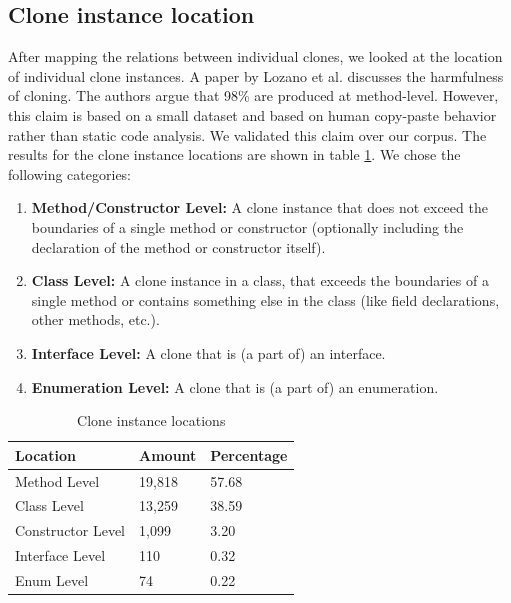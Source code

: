 \documentclass[a4paper]{article}
\begin{document}
\subsection{Clone instance location}\label{chap:clonelocation}
After mapping the relations between individual clones, we looked at the location of individual clone instances. A paper by Lozano et al. \cite{lozano2007evaluating} discusses the harmfulness of cloning. The authors argue that 98\% are produced at method-level. However, this claim is based on a small dataset and based on human copy-paste behavior rather than static code analysis. We validated this claim over our corpus. The results for the clone instance locations are shown in table \ref{table:locations}. We chose the following categories:
\begin{enumerate}
  \item \textbf{Method/Constructor Level:} A clone instance that does not exceed the boundaries of a single method or constructor (optionally including the declaration of the method or constructor itself).
  \item \textbf{Class Level:} A clone instance in a class, that exceeds the boundaries of a single method or contains something else in the class (like field declarations, other methods, etc.).
  \item \textbf{Interface Level:} A clone that is (a part of) an interface.
  \item \textbf{Enumeration Level:} A clone that is (a part of) an enumeration.
\end{enumerate}

\begin{table}[H]
  \begin{center}
  \caption{Clone instance locations} \label{table:locations}
  \bigskip
\begin{tabular}{|l|l|l|}
\hline
\textbf{Location}  & \textbf{Amount}  & \textbf{Percentage} \\ \hline
Method Level       & 19,818           & 57.68               \\ \hline
Class Level        & 13,259           & 38.59               \\ \hline
Constructor Level  & 1,099            & 3.20                \\ \hline
Interface Level    & 110              & 0.32                \\ \hline
Enum Level         & 74               & 0.22                \\ \hline
\end{tabular}
\end{center}
\end{table}
\end{document}
